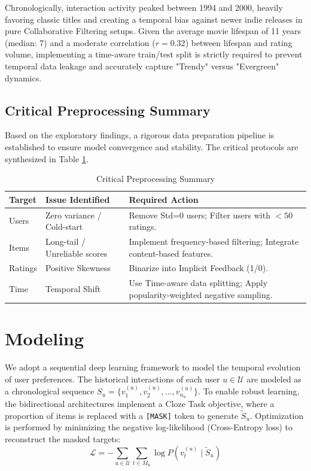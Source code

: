 \documentclass[conference]{IEEEtran}
\begin{document}
Chronologically, interaction activity peaked between 1994 and 2000, heavily favoring classic titles and creating a temporal bias against newer indie releases in pure Collaborative Filtering setups. Given the average movie lifespan of 11 years (median: 7) and a moderate correlation ($r=0.32$) between lifespan and rating volume, implementing a time-aware train/test split is strictly required to prevent temporal data leakage and accurately capture "Trendy" versus "Evergreen" dynamics.

\subsection{Critical Preprocessing Summary}
Based on the exploratory findings, a rigorous data preparation pipeline is established to ensure model convergence and stability. The critical protocols are synthesized in Table \ref{tab:preprocessing_summary}.

\begin{table}[htbp]
\centering
\begin{tabular}{|p{0.75cm}|p{2.3cm}|p{4.5cm}|}
\hline
\textbf{Target} & \textbf{Issue Identified} & \textbf{Required Action} \\
\hline
Users & Zero variance / Cold-start & Remove Std=0 users; Filter users with $<50$ ratings. \\ \hline
Items & Long-tail / Unreliable scores & Implement frequency-based filtering; Integrate content-based features. \\ \hline
Ratings & Positive Skewness & Binarize into Implicit Feedback (1/0). \\ \hline
Time & Temporal Shift & Use Time-aware data splitting; Apply popularity-weighted negative sampling. \\
\hline
\end{tabular}
\caption{Critical Preprocessing Summary}
\label{tab:preprocessing_summary}
\end{table}

\section{Modeling}
\label{sec:modeling}
We adopt a sequential deep learning framework to model the temporal evolution of user preferences. The historical interactions of each user $u \in \mathcal{U}$ are modeled as a chronological sequence $S_u = \{v_1^{(u)}, v_2^{(u)}, \dots, v_{n_u}^{(u)}\}$. To enable robust learning, the bidirectional architectures implement a Cloze Task objective, where a proportion of items is replaced with a \texttt{[MASK]} token to generate $\tilde{S}_u$. Optimization is performed by minimizing the negative log-likelihood (Cross-Entropy loss) to reconstruct the masked targets:
\begin{equation}
\mathcal{L} = - \sum_{u \in \mathcal{U}} \sum_{t \in M_u} \log P(v_t^{(u)} \mid \tilde{S}_u)
\end{equation}
\end{document}
